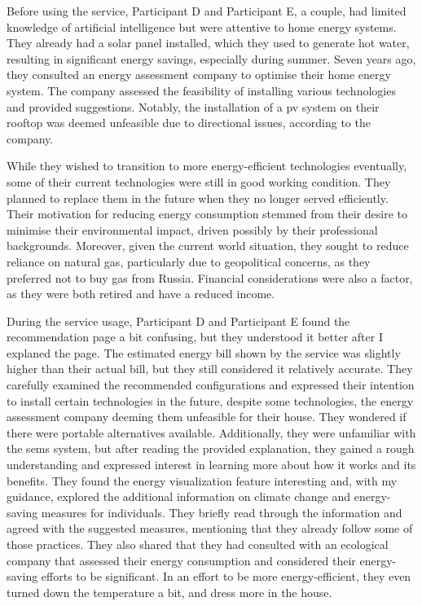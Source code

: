 Before using the service, 
Participant D and Participant E, a couple, 
had limited knowledge of artificial intelligence but were attentive to home energy systems. 
They already had a solar panel installed, which they used to generate hot water, resulting in significant energy savings, especially during summer. 
Seven years ago, they consulted an energy assessment company to optimise their home energy system. 
The company assessed the feasibility of installing various technologies and provided suggestions. 
Notably, the installation of a \gls{pv} system on their rooftop was deemed unfeasible due to directional issues, according to the company.

While they wished to transition to more energy-efficient technologies eventually, 
some of their current technologies were still in good working condition. 
They planned to replace them in the future when they no longer served efficiently. 
Their motivation for reducing energy consumption stemmed from their desire to minimise their environmental impact, 
driven possibly by their professional backgrounds. 
Moreover, given the current world situation, they sought to reduce reliance on natural gas, 
particularly due to geopolitical concerns, as they preferred not to buy gas from Russia. 
Financial considerations were also a factor, as they were both retired and have a reduced income.

During the service usage, 
Participant D and Participant E found the recommendation page a bit confusing, but they understood it better after I explaned the page.
The estimated energy bill shown by the service was slightly higher than their actual bill, but they still considered it relatively accurate. 
They carefully examined the recommended configurations and expressed their intention to install certain technologies in the future, 
despite some technologies, the energy assessment company deeming them unfeasible for their house. 
They wondered if there were portable alternatives available. 
Additionally, they were unfamiliar with the \gls{sems} system, but after reading the provided explanation, they gained a rough understanding and expressed interest in learning more about how it works and its benefits.
They found the energy visualization feature interesting and, with my guidance, explored the additional information on climate change and energy-saving measures for individuals.
They briefly read through the information and agreed with the suggested measures, mentioning that they already follow some of those practices. 
They also shared that they had consulted with an ecological company that assessed their energy consumption and considered their energy-saving efforts to be significant. 
In an effort to be more energy-efficient, they even turned down the temperature a bit, and dress more in the house. 


